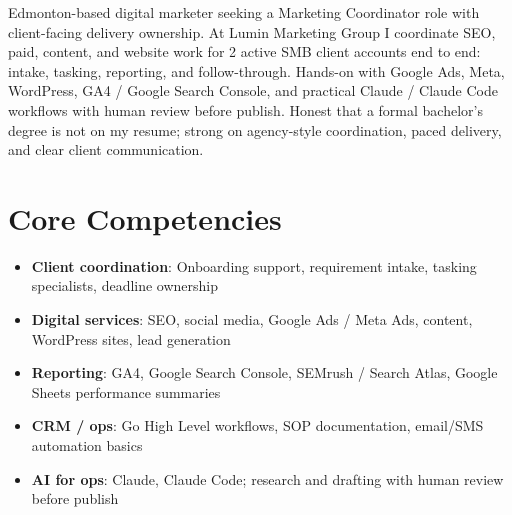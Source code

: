 \documentclass[11pt,a4paper,sans]{moderncv}
\begin{document}
\makecvtitle

\vspace{6pt}
\small{Edmonton-based digital marketer seeking a Marketing Coordinator role with client-facing delivery ownership. At Lumin Marketing Group I coordinate SEO, paid, content, and website work for 2 active SMB client accounts end to end: intake, tasking, reporting, and follow-through. Hands-on with Google Ads, Meta, WordPress, GA4 / Google Search Console, and practical Claude / Claude Code workflows with human review before publish. Honest that a formal bachelor's degree is not on my resume; strong on agency-style coordination, paced delivery, and clear client communication.}

\section{Core Competencies}
\vspace{1pt}
\begin{itemize}
\item \textbf{Client coordination}: Onboarding support, requirement intake, tasking specialists, deadline ownership
\item \textbf{Digital services}: SEO, social media, Google Ads / Meta Ads, content, WordPress sites, lead generation
\item \textbf{Reporting}: GA4, Google Search Console, SEMrush / Search Atlas, Google Sheets performance summaries
\item \textbf{CRM / ops}: Go High Level workflows, SOP documentation, email/SMS automation basics
\item \textbf{AI for ops}: Claude, Claude Code; research and drafting with human review before publish
\end{itemize}
\end{document}
